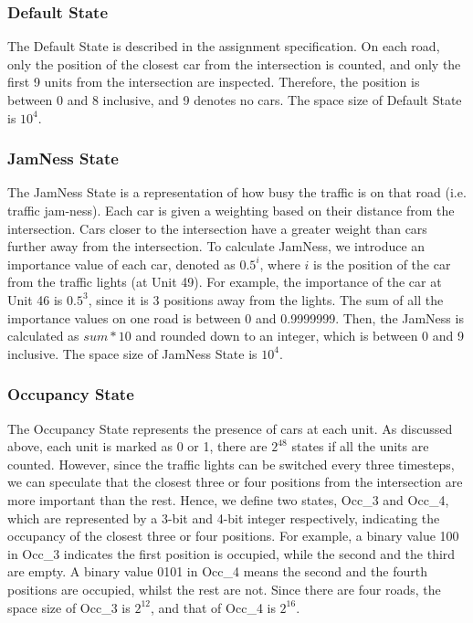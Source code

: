 \subsubsection{Default State}
The Default State is described in the assignment specification. On each road,
only the position of the closest car from the intersection is counted, and only
the first 9 units from the intersection are inspected. Therefore, the position
is between 0 and 8 inclusive, and 9 denotes no cars. The space size of Default
State is $10^4$.

\subsubsection{JamNess State}
The JamNess State is a representation of how busy the traffic is on that road
(i.e. traffic jam-ness). Each car is given a weighting based on their distance
from the intersection. Cars closer to the intersection have a greater weight
than cars further away from the intersection. To calculate JamNess, we introduce
an importance value of each car, denoted as $0.5^i$, where $i$ is the position
of the car from the traffic lights (at Unit 49). For example, the importance of
the car at Unit 46 is $0.5^3$, since it is 3 positions away from the lights. The
sum of all the importance values on one road is between 0 and 0.9999999. Then,
the JamNess is calculated as $sum * 10$ and rounded down to an integer, which is
between 0 and 9 inclusive. The space size of JamNess State is $10^4$.

\subsubsection{Occupancy State}
The Occupancy State represents the presence of cars at each unit. As discussed
above, each unit is marked as 0 or 1, there are $2^{48}$ states if all the units
are counted. However, since the traffic lights can be switched every three
timesteps, we can speculate that the closest three or four positions from the
intersection are more important than the rest. Hence, we define two states,
Occ\_3 and Occ\_4, which are represented by a 3-bit and 4-bit integer
respectively, indicating the occupancy of the closest three or four positions.
For example, a binary value 100 in Occ\_3 indicates the first position is
occupied, while the second and the third are empty. A binary value 0101 in
Occ\_4 means the second and the fourth positions are occupied, whilst the rest
are not. Since there are four roads, the space size of Occ\_3 is $2^{12}$, and
that of Occ\_4 is $2^{16}$.


